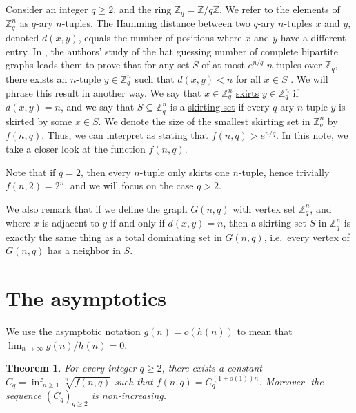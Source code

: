 \documentclass[12pt,reqno]{article}
\newtheorem{thm}{Theorem}%
\newcommand{\ZZ}{\mathbb Z}
\begin{document}
Consider an integer $q \geq 2$, and the ring $\ZZ_q = \ZZ / q \ZZ$.
We refer to the elements of $\ZZ_q^n$ as \underline{$q$-ary $n$-tuples}.
The \underline{Hamming distance} between two $q$-ary $n$-tuples $x$ and $y$, denoted $d(x,y)$, equals the number of positions where $x$ and $y$ have a different entry.
In \cite{alon}, the authors' study of the hat guessing number of complete bipartite graphs leads them to prove that for any set $S$ of at most $e^{n/q}$ $n$-tuples over $\ZZ_q$, there exists an $n$-tuple $y \in \ZZ_q^n$ such that $d(x,y) < n$ for all $x \in S$ \cite[Lemma 3.3]{alon}.
We will phrase this result in another way.
We say that $x \in \ZZ_q^n$ \underline{skirts} $y \in \ZZ_q^n$ if $d(x,y) = n$, and we say that $S \subseteq \ZZ_q^n$ is a \underline{skirting set} if every $q$-ary $n$-tuple $y$ is skirted by some $x \in S$.
We denote the size of the smallest skirting set in $\ZZ_q^n$ by $f(n,q)$.
Thus, we can interpret \cite[Lemma 3.3]{alon} as stating that $f(n,q) > e^{n/q}$.
In this note, we take a closer look at the function $f(n,q)$.

\bigskip

Note that if $q=2$, then every $n$-tuple only skirts one $n$-tuple, hence trivially $f(n,2)=2^n$, and we will focus on the case $q>2$.

We also remark that if we define the graph $G(n,q)$ with vertex set $\ZZ_q^n$, and where $x$ is adjacent to $y$ if and only if $d(x,y) = n$, then a skirting set $S$ in $\ZZ_q^n$ is exactly the same thing as a \underline{total dominating set} in $G(n,q)$, i.e.\ every vertex of $G(n,q)$ has a neighbor in $S$.

\section{The asymptotics}
We use the asymptotic notation $g(n) = o(h(n))$ to mean that $\lim_{n \to \infty} g(n)/h(n) = 0$.



\begin{thm}\label{thm:rec}
 For every integer $q \geq 2$, there exists a constant $C_q = \inf_{n \geq 1} \sqrt[n]{f(n,q)}$ such that $f(n,q) = C_q^{(1+o(1))n}$.
 Moreover, the sequence $(C_q)_{q\geq 2}$ is non-increasing. 
\end{thm}
\end{document}
